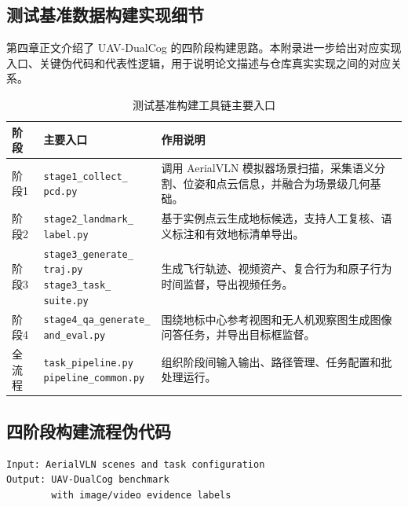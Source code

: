 \begin{thesisappendix}
\section{测试基准数据构建实现细节}
\label{app:toolchain-entry}

第四章正文介绍了 UAV-DualCog 的四阶段构建思路。本附录进一步给出对应实现入口、关键伪代码和代表性逻辑，用于说明论文描述与仓库真实实现之间的对应关系。

\begin{table}[htbp]
    \centering
    \caption{测试基准构建工具链主要入口}
    \label{tab:app-toolchain}
    \scriptsize
    \begin{tabularx}{\textwidth}{@{}p{1.7cm}p{3.8cm}X@{}}
        \toprule
        阶段 & 主要入口 & 作用说明 \\
        \midrule
        阶段1 & \makecell[l]{\texttt{stage1\_collect\_}\\\texttt{pcd.py}} & 调用 AerialVLN 模拟器场景扫描，采集语义分割、位姿和点云信息，并融合为场景级几何基础。 \\
        阶段2 & \makecell[l]{\texttt{stage2\_landmark\_}\\\texttt{label.py}} & 基于实例点云生成地标候选，支持人工复核、语义标注和有效地标清单导出。 \\
        阶段3 & \makecell[l]{\texttt{stage3\_generate\_}\\\texttt{traj.py}\\\texttt{stage3\_task\_}\\\texttt{suite.py}} & 生成飞行轨迹、视频资产、复合行为和原子行为时间监督，导出视频任务。 \\
        阶段4 & \makecell[l]{\texttt{stage4\_qa\_generate\_}\\\texttt{and\_eval.py}} & 围绕地标中心参考视图和无人机观察图生成图像问答任务，并导出目标框监督。 \\
        全流程 & \makecell[l]{\texttt{task\_pipeline.py}\\\texttt{pipeline\_common.py}} & 组织阶段间输入输出、路径管理、任务配置和批处理运行。 \\
        \bottomrule
    \end{tabularx}
\end{table}

\subsection{四阶段构建流程伪代码}

\begin{verbatim}
Input: AerialVLN scenes and task configuration
Output: UAV-DualCog benchmark
        with image/video evidence labels


\end{verbatim}
\end{thesisappendix}
